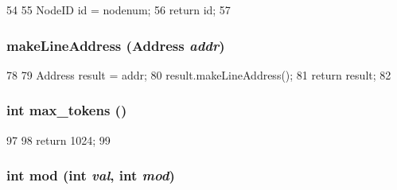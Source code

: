 \begin{DoxyCode}
54 {
55     NodeID id = nodenum;
56     return id;
57 }
\end{DoxyCode}
\hypertarget{RubySlicc__Util_8hh_a34d8ac0b1033cd01b3c076a556e599ba}{
\subsubsection[{makeLineAddress}]{ makeLineAddress ({\bf Address} {\em addr})}}
\label{RubySlicc__Util_8hh_a34d8ac0b1033cd01b3c076a556e599ba}



\begin{DoxyCode}
78 {
79     Address result = addr;
80     result.makeLineAddress();
81     return result;
82 }
\end{DoxyCode}
\hypertarget{RubySlicc__Util_8hh_a1998a5b4fa544ddc060d14af78eb6f0b}{
\subsubsection[{max\_\-tokens}]{\setlength{\rightskip}{0pt plus 5cm}int max\_\-tokens ()}}
\label{RubySlicc__Util_8hh_a1998a5b4fa544ddc060d14af78eb6f0b}



\begin{DoxyCode}
97 {
98   return 1024;
99 }
\end{DoxyCode}
\hypertarget{RubySlicc__Util_8hh_a1ae500ce573418f748bb5c85167c3bfb}{
\subsubsection[{mod}]{\setlength{\rightskip}{0pt plus 5cm}int mod (int {\em val}, \/  int {\em mod})}}
\label{RubySlicc__Util_8hh_a1ae500ce573418f748bb5c85167c3bfb}



